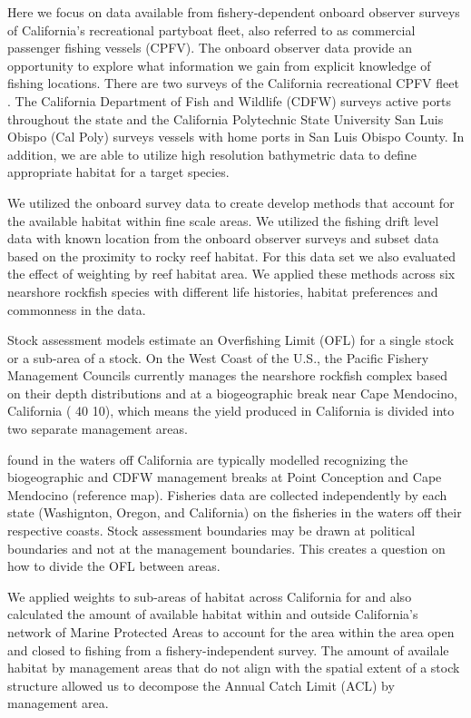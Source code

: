 \documentclass[
  12pt,
  authoryear,
  preprint,
  3p]{elsarticle}
\begin{document}
Here we focus on data available from fishery-dependent onboard observer
surveys of California's recreational partyboat fleet, also referred to
as commercial passenger fishing vessels (CPFV). The onboard observer
data provide an opportunity to explore what information we gain from
explicit knowledge of fishing locations. There are two surveys of the
California recreational CPFV fleet \citep{Monk:2014:DRD}. The California
Department of Fish and Wildlife (CDFW) surveys active ports throughout
the state and the California Polytechnic State University San Luis
Obispo (Cal Poly) surveys vessels with home ports in San Luis Obispo
County. In addition, we are able to utilize high resolution bathymetric
data to define appropriate habitat for a target species.

We utilized the onboard survey data to create develop methods that
account for the available habitat within fine scale areas. We utilized
the fishing drift level data with known location from the onboard
observer surveys and subset data based on the proximity to rocky reef
habitat. For this data set we also evaluated the effect of weighting by
reef habitat area. We applied these methods across six nearshore
rockfish species with different life histories, habitat preferences and
commonness in the data.

Stock assessment models estimate an Overfishing Limit (OFL) for a single
stock or a sub-area of a stock. On the West Coast of the U.S., the
Pacific Fishery Management Councils currently manages the nearshore
rockfish complex based on their depth distributions and at a
biogeographic break near Cape Mendocino, California ( 40 10), which
means the yield produced in California is divided into two separate
management areas.

found in the waters off California are typically modelled recognizing
the biogeographic and CDFW management breaks at Point Conception and
Cape Mendocino (reference map). Fisheries data are collected
independently by each state (Washignton, Oregon, and California) on the
fisheries in the waters off their respective coasts. Stock assessment
boundaries may be drawn at political boundaries and not at the
management boundaries. This creates a question on how to divide the OFL
between areas.

We applied weights to sub-areas of habitat across California for and
also calculated the amount of available habitat within and outside
California's network of Marine Protected Areas to account for the area
within the area open and closed to fishing from a fishery-independent
survey. The amount of availale habitat by management areas that do not
align with the spatial extent of a stock structure allowed us to
decompose the Annual Catch Limit (ACL) by management area.
\end{document}
